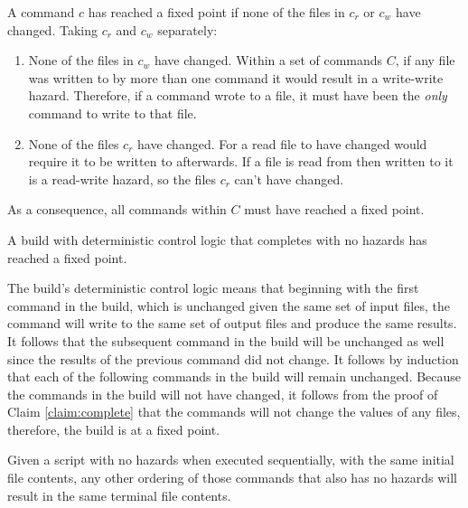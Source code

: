 \proof A command $c$ has reached a fixed point if none of the files in $c_r$ or $c_w$ have changed. Taking $c_r$ and $c_w$ separately:

\begin{enumerate}
\item None of the files in $c_w$ have changed. Within a set of commands $C$, if any file was written to by more than one command it would result in a write-write hazard. Therefore, if a command wrote to a file, it must have been the \emph{only} command to write to that file.
\item None of the files $c_r$ have changed. For a read file to have changed would require it to be written to afterwards. If a file is read from then written to it is a read-write hazard, so the files $c_r$ can't have changed.
\end{enumerate}

As a consequence, all commands within $C$ must have reached a fixed point.


\begin{claim} A build with deterministic control logic that completes with no hazards has reached a fixed point.  %
\label{claim:no_rebuild}
\end{claim}


\proof The build's deterministic control logic means that beginning with the first command in the build, which is unchanged given the same set of input files, the command will write to the same set of output files and produce the same results.  It follows that the subsequent command in the build will be unchanged as well since the results of the previous command did not change.  It follows by induction that each of the following commands in the build will remain unchanged.
Because the commands in the build will not have changed, it follows from the proof of Claim \ref{claim:complete} that the commands will not change the values of any files, therefore, the build is at a fixed point.

\begin{claim}
\label{claim:reorder}

Given a script with no hazards when executed sequentially, with the same initial file contents, any other ordering of those commands that also has no hazards will result in the same terminal file contents.
\end{claim}

